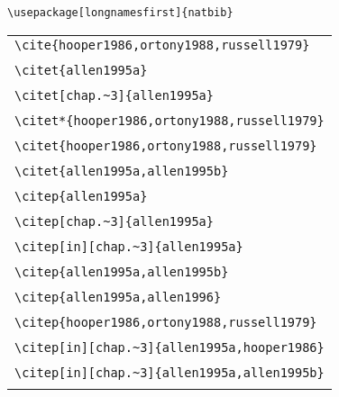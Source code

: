 \documentclass{article}
\begin{document}
\verb#\usepackage[longnamesfirst]{natbib}#\\

\begin{center}
\begin{tabular}{l}
\verb#\cite{hooper1986,ortony1988,russell1979}# \\
\cite{hooper1986,ortony1988,russell1979}  \\\hline \hline
%
\verb#\citet{allen1995a}# \\
 \citet{allen1995a} \\\hline
\verb#\citet[chap.~3]{allen1995a}# \\
 \citet[chap.~3]{allen1995a} \\\hline
\verb#\citet*{hooper1986,ortony1988,russell1979}# \\
 \citet*{hooper1986,ortony1988,russell1979}  \\\hline
\verb#\citet{hooper1986,ortony1988,russell1979}# \\
 \citet{hooper1986,ortony1988,russell1979}  \\\hline
\verb#\citet{allen1995a,allen1995b}# \\
 \citet{allen1995a,allen1995b} \\\hline\hline
%
\verb#\citep{allen1995a}# \\
 \citep{allen1995a} \\\hline
\verb#\citep[chap.~3]{allen1995a}# \\
 \citep[chap.~3]{allen1995a} \\\hline
\verb#\citep[in][chap.~3]{allen1995a}# \\
 \citep[in][chap.~3]{allen1995a} \\\hline
\verb#\citep{allen1995a,allen1995b}# \\
 \citep{allen1995a,allen1995b} \\\hline
\verb#\citep{allen1995a,allen1996}# \\
 \citep{allen1995a,allen1996} \\\hline
\verb#\citep{hooper1986,ortony1988,russell1979}# \\
 \citep{hooper1986,ortony1988,russell1979}  \\\hline
\verb#\citep[in][chap.~3]{allen1995a,hooper1986}# \\
 \citep[in][chap.~3]{allen1995a,hooper1986} \\\hline
[Fails in 1.9.15] \verb#\citep[in][chap.~3]{allen1995a,allen1995b}# \\
 \citep[in][chap.~3]{allen1995a,allen1995b} \\\hline

\end{tabular}
\end{center}
\end{document}
